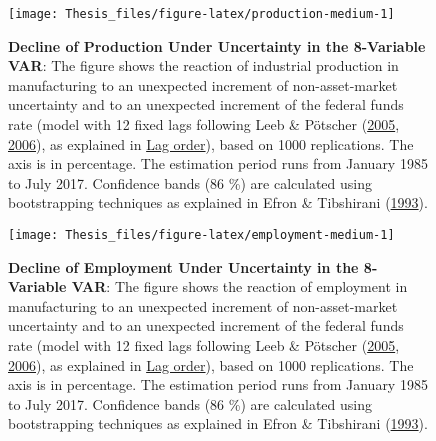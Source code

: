 \documentclass[12pt,twoside]{reedthesis}
\begin{document}
\begin{figure}

{\centering \texttt{[image: Thesis\_files/figure-latex/production-medium-1]} 

}

\caption[Decline of Production Under Uncertainty in the 8-Variable VAR]{\textbf{Decline of Production Under Uncertainty in the 8-Variable VAR}: The figure shows the reaction of industrial production in manufacturing to an unexpected increment of non-asset-market uncertainty and to an unexpected increment of the federal funds rate (model with 12 fixed lags following Leeb \& Pötscher (\protect\hyperlink{ref-leebpots:2005}{2005}, \protect\hyperlink{ref-leebpots:2006}{2006}), as explained in \protect\hyperlink{lag-order}{Lag order}), based on 1000 replications. The axis is in percentage. The estimation period runs from January 1985 to July 2017. Confidence bands (86 \%) are calculated using bootstrapping techniques as explained in Efron \& Tibshirani (\protect\hyperlink{ref-efrotibs:1993}{1993}).}\label{fig:production-medium}
\end{figure}

\begin{figure}

{\centering \texttt{[image: Thesis\_files/figure-latex/employment-medium-1]} 

}

\caption[Decline of Employment Under Uncertainty in the 8-Variable VAR]{\textbf{Decline of Employment Under Uncertainty in the 8-Variable VAR}: The figure shows the reaction of employment in manufacturing to an unexpected increment of non-asset-market uncertainty and to an unexpected increment of the federal funds rate (model with 12 fixed lags following Leeb \& Pötscher (\protect\hyperlink{ref-leebpots:2005}{2005}, \protect\hyperlink{ref-leebpots:2006}{2006}), as explained in \protect\hyperlink{lag-order}{Lag order}), based on 1000 replications. The axis is in percentage. The estimation period runs from January 1985 to July 2017. Confidence bands (86 \%) are calculated using bootstrapping techniques as explained in Efron \& Tibshirani (\protect\hyperlink{ref-efrotibs:1993}{1993}).}\label{fig:employment-medium}
\end{figure}
\end{document}
